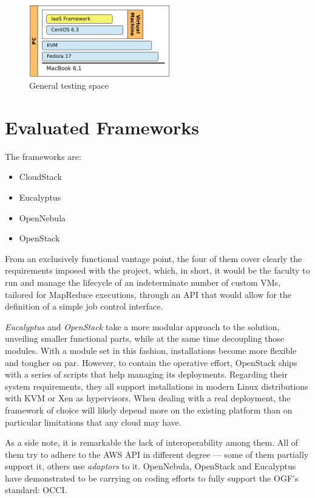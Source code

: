 \begin{figure}[tbp]
\begin{center}
\includegraphics[width=0.55\textwidth]{imagenes/007.pdf}
 \caption{General testing space}
\label{fig:espacioprueba}
\end{center}
\end{figure}

\section{Evaluated Frameworks}\label{sec:frameworksevaluados}

\noindent The frameworks are:
\begin{itemize}
 \item CloudStack %
 \item Eucalyptus %
 \item OpenNebula %
 \item OpenStack
\end{itemize}

From an exclusively functional vantage point, the four of them cover clearly the requirements imposed with the project, which, in short, it would be the faculty to run and manage the lifecycle of an indeterminate number of custom VMs, tailored for MapReduce executions, through an API that would allow for the definition of a simple job control interface.

\emph{Eucalyptus} and \emph{OpenStack} take a more modular approach to the solution, unveiling smaller functional parts, while at the same time decoupling those modules. With a module set in this fashion, installations become more flexible and tougher on par. However, to contain the operative effort, OpenStack ships with a series of scripts that help managing its deployments. Regarding their system requirements, they all support installations in modern Linux distributions with KVM or Xen as hypervisors. When dealing with a real deployment, the framework of choice will likely depend more on the existing platform than on particular limitations that any cloud may have.

As a side note, it is remarkable the lack of interoperability among them. All of them try to adhere to the AWS API in different degree --- some of them partially support it, others use \emph{adaptors} to it. OpenNebula, OpenStack and Eucalyptus have demonstrated to be carrying on coding efforts to fully support the OGF's standard: OCCI.

